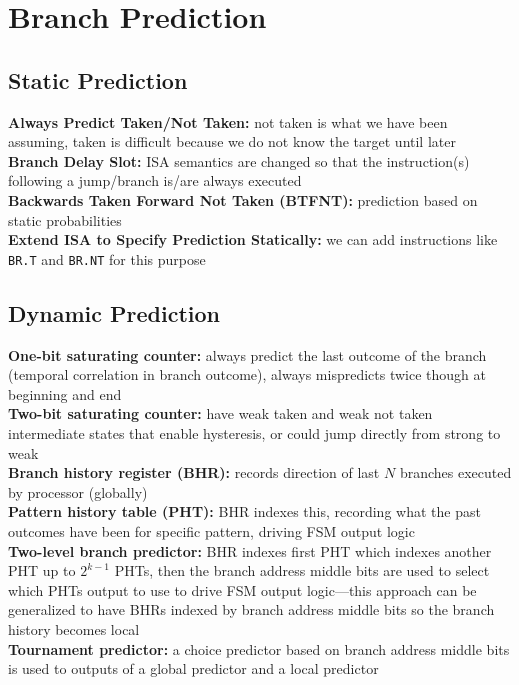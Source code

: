\documentclass{article}
\begin{document}
\section{Branch Prediction}

\subsection{Static Prediction}

\textbf{Always Predict Taken/Not Taken:} not taken is what we have been assuming, taken is difficult because we do not know the target until later \\
\textbf{Branch Delay Slot:} ISA semantics are changed so that the instruction(s) following a jump/branch is/are always executed \\
\textbf{Backwards Taken Forward Not Taken (BTFNT):} prediction based on static probabilities \\
\textbf{Extend ISA to Specify Prediction Statically:} we can add instructions like \texttt{BR.T} and \texttt{BR.NT} for this purpose

\subsection{Dynamic Prediction}

\textbf{One-bit saturating counter:} always predict the last outcome of the branch (temporal correlation in branch outcome), always mispredicts twice though at beginning and end \\
\textbf{Two-bit saturating counter:} have weak taken and weak not taken intermediate states that enable hysteresis, or could jump directly from strong to weak \\
\textbf{Branch history register (BHR):} records direction of last $N$ branches executed by processor (globally) \\
\textbf{Pattern history table (PHT):} BHR indexes this, recording what the past outcomes have been for specific pattern, driving FSM output logic \\
\textbf{Two-level branch predictor:} BHR indexes first PHT which indexes another PHT up to $2^{k-1}$ PHTs, then the branch address middle bits are used to select which PHTs output to use to drive FSM output logic---this approach can be generalized to have BHRs indexed by branch address middle bits so the branch history becomes local \\
\textbf{Tournament predictor:} a choice predictor based on branch address middle bits is used to outputs of a global predictor and a local predictor
\end{document}
